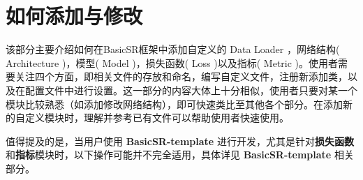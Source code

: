 \documentclass[../main.tex]{subfiles}
\begin{document}
\chapter{如何添加与修改}
\vspace{-2cm}

该部分主要介绍如何在BasicSR框架中添加自定义的 Data Loader ，网络结构( Architecture )，模型( Model )，损失函数( Loss )以及指标( Metric )。使用者需要关注四个方面，即相关文件的存放和命名，编写自定义文件，注册新添加类，以及在配置文件中进行设置。这一部分的内容大体上十分相似，使用者只要对某一个模块比较熟悉（如添加修改网络结构），即可快速类比至其他各个部分。在添加新的自定义模块时，理解并参考已有文件可以帮助使用者快速使用。

值得提及的是，当用户使用 \textbf{BasicSR-template} 进行开发，尤其是针对\textbf{损失函数}和\textbf{指标}模块时，以下操作可能并不完全适用，具体详见 \textbf{BasicSR-template} 相关部分。
\end{document}
